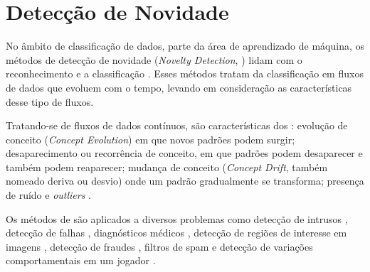 
\section{Detecção de Novidade}\label{sec:nd}

\newcommand{\novelty}{\emph{Novelty Detection}\xspace}
\newcommand{\drift}{\emph{Concept Drift}\xspace}
\newcommand{\evolution}{\emph{Concept Evolution}\xspace}

No âmbito de classificação de dados, parte da área de aprendizado de máquina, os
métodos de detecção de novidade (\novelty, \nd) lidam com o reconhecimento e a 
classificação  \cite{PERNER2007,Gama2010}.
Esses métodos tratam da classificação em fluxos de dados que evoluem com o
tempo, levando em consideração as características desse tipo de fluxos.


Tratando-se de fluxos de dados contínuos, são características
dos :
evolução de conceito (\evolution) em que novos padrões podem surgir;
desaparecimento ou recorrência de conceito, em que padrões podem desaparecer e
também podem reaparecer;
mudança de conceito (\drift, também nomeado deriva ou desvio) onde um padrão
gradualmente se transforma;
presença de ruído e \emph{outliers} \cite{Gama2010}.


Os métodos de \nd são aplicados a diversos problemas como
detecção de intrusos \cite{Coull2003,Spinosa2008,Viegas2019,Cassales2019a},
detecção de falhas \cite{Zhang2006},
diagnósticos médicos \cite{Perner2009},
detecção de regiões de interesse em imagens \cite{singh2004approach},
detecção de fraudes \cite{wang2003mining,Abdallah201690}, 
filtros de spam \cite{Hayat2010dct} e
detecção de variações comportamentais em um jogador \cite{Vallim20136258}.


